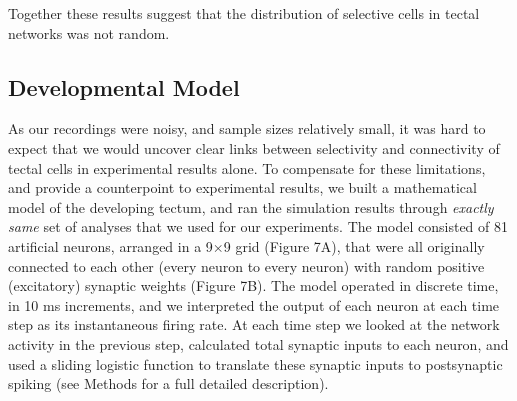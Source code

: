 \documentclass{article}
\begin{document}
Together these results suggest that the distribution of selective cells in tectal networks was not random.


\subsection*{Developmental Model}

As our recordings were noisy, and sample sizes relatively small, it was hard to expect that we would uncover clear links between selectivity and connectivity of tectal cells in experimental results alone. To compensate for these limitations, and provide a counterpoint to experimental results, we built a mathematical model of the developing tectum, and ran the simulation results through \textit{exactly same} set of analyses that we used for our experiments. The model consisted of 81 artificial neurons, arranged in a 9$\times$9 grid (Figure 7A), that were all originally connected to each other (every neuron to every neuron) with random positive (excitatory) synaptic weights (Figure 7B). The model operated in discrete time, in 10 ms increments, and we interpreted the output of each neuron at each time step as its instantaneous firing rate. At each time step we looked at the network activity in the previous step, calculated total synaptic inputs to each neuron, and used a sliding logistic function to translate these synaptic inputs to postsynaptic spiking (see Methods for a full detailed description).
\end{document}
